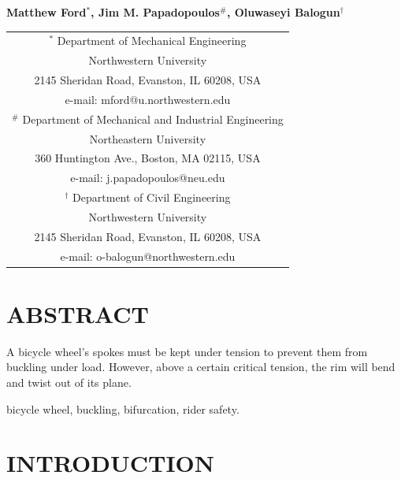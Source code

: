 \documentclass{bmd2016p}
\begin{document}
\begin{center}
\end{center}

\begin{center}
\normalsize{\bf{Matthew Ford$^{*}$, Jim M. Papadopoulos$^\#$, 
            Oluwaseyi Balogun$^\dag$}}
\end{center} 

\begin{center}
\begin{tabular}{c}
$^*$ Department of Mechanical Engineering\\
Northwestern University\\
2145 Sheridan Road, Evanston, IL 60208, USA\\
e-mail: mford@u.northwestern.edu\\[2.5ex]

$^\#$ Department of Mechanical and Industrial Engineering\\
Northeastern University\\
360 Huntington Ave., Boston, MA 02115, USA\\
e-mail: j.papadopoulos@neu.edu\\[2.5ex]

$^\dag$ Department of Civil Engineering\\
Northwestern University\\
2145 Sheridan Road, Evanston, IL 60208, USA\\
e-mail: o-balogun@northwestern.edu\\
\end{tabular}
\end{center}

\section*{ABSTRACT}
A bicycle wheel's spokes must be kept under tension to prevent them from buckling under load. However, above a certain critical tension, the rim will bend and twist out of its plane.


\begin{keywords}
bicycle wheel, 
buckling, 
bifurcation,
rider safety.
\end{keywords}





\section{INTRODUCTION}
\end{document}
